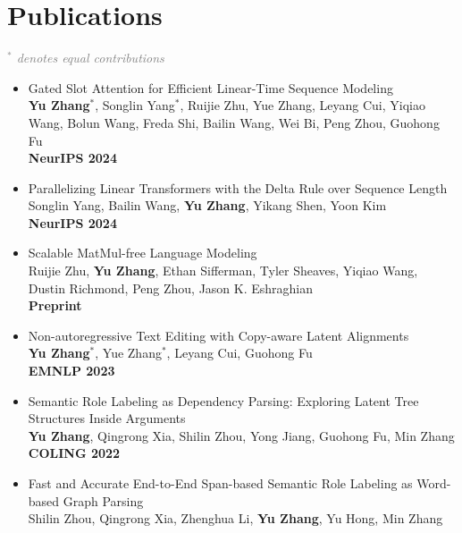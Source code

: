 \documentclass[a4paper,12pt]{article}
\begin{document}
\section{Publications}
\textcolor{gray}{\emph{$^*$ denotes equal contributions}}


\begin{itemize}[leftmargin=18pt]
      \item Gated Slot Attention for Efficient Linear-Time Sequence Modeling \\
            \textbf{Yu Zhang$^*$}, Songlin Yang$^*$, Ruijie Zhu, Yue Zhang, Leyang Cui, Yiqiao Wang, Bolun Wang, Freda Shi, Bailin Wang, Wei Bi, Peng Zhou, Guohong Fu \\
            \textbf{NeurIPS 2024}
      \item Parallelizing Linear Transformers with the Delta Rule over Sequence Length \\
            Songlin Yang, Bailin Wang, \textbf{Yu Zhang}, Yikang Shen, Yoon Kim \\
            \textbf{NeurIPS 2024}
      \item Scalable MatMul-free Language Modeling \\
            Ruijie Zhu, \textbf{Yu Zhang}, Ethan Sifferman, Tyler Sheaves, Yiqiao Wang, Dustin Richmond, Peng Zhou, Jason K. Eshraghian \\
            \textbf{Preprint}
      \item Non-autoregressive Text Editing with Copy-aware Latent Alignments \\
            \textbf{Yu Zhang$^*$}, Yue Zhang$^*$, Leyang Cui, Guohong Fu\\
            \textbf{EMNLP 2023}
      \item Semantic Role Labeling as Dependency Parsing: Exploring Latent Tree Structures Inside Arguments\\
            \textbf{Yu Zhang}, Qingrong Xia, Shilin Zhou, Yong Jiang, Guohong Fu, Min Zhang\\
            \textbf{COLING 2022}
      \item Fast and Accurate End-to-End Span-based Semantic Role Labeling as Word-based Graph Parsing\\
            Shilin Zhou, Qingrong Xia, Zhenghua Li, \textbf{Yu Zhang}, Yu Hong, Min Zhang\\

\end{itemize}
\end{document}
